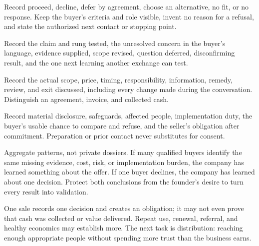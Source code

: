 \begin{description}[leftmargin=2.5em,style=nextline,itemsep=0.3em]
\item[Decision] Record proceed, decline, defer by agreement, choose an
  alternative, no fit, or no response. Keep the buyer's criteria and role
  visible, invent no reason for a refusal, and state the authorized next contact
  or stopping point.
\item[Evidence step] Record the claim and rung tested, the unresolved concern in
  the buyer's language, evidence supplied, scope revised, question deferred,
  disconfirming result, and the one next learning another exchange can test.
\item[Commercial terms] Record the actual scope, price, timing, responsibility,
  information, remedy, review, and exit discussed, including every change made
  during the conversation. Distinguish an agreement, invoice, and collected
  cash.
\item[Consent and delivery] Record material disclosure, safeguards, affected
  people, implementation duty, the buyer's usable chance to compare and refuse,
  and the seller's obligation after commitment. Preparation or prior contact
  never substitutes for consent.
\end{description}

Aggregate patterns, not private dossiers. If many qualified buyers identify
the same missing evidence, cost, risk, or implementation burden, the company
has learned something about the offer. If one buyer declines, the company has
learned about one decision. Protect both conclusions from the founder's desire
to turn every result into validation.

One sale records one decision and creates an obligation; it may not even prove
that cash was collected or value delivered. Repeat use, renewal, referral, and
healthy economics may establish more. The next task is distribution: reaching
enough appropriate people without spending more trust than the business earns.
